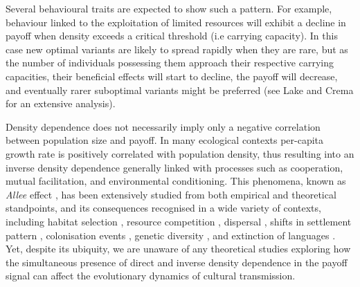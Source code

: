 \documentclass[review,authoryear]{elsarticle}
\begin{document}
Several behavioural traits are expected to show such a pattern. For example, behaviour linked to the exploitation of limited resources will exhibit a decline in payoff when density exceeds a critical threshold (i.e carrying capacity). In this case new optimal variants are likely to spread rapidly when they are rare, but as the number of individuals possessing them approach their respective carrying capacities, their beneficial effects will start to decline, the payoff will decrease, and eventually rarer suboptimal variants might be preferred (see Lake and Crema \citeyear{lake_and_crema_2012} for an extensive analysis). 

Density dependence does not necessarily imply only a negative correlation between population size and payoff. In many ecological contexts per-capita growth rate is positively correlated with population density, thus resulting into an inverse density dependence generally linked with processes such as cooperation, mutual facilitation, and environmental conditioning. This phenomena, known as \emph{Allee} effect \citep{allee1958,courchamp_etal_1999}, has been extensively studied  from both empirical and theoretical standpoints, and its consequences recognised in a wide variety of contexts, including habitat selection \citep{greene_and_stamps_2001}, resource competition \citep{jang2013},  dispersal \citep{steele_2009}, shifts in settlement pattern \citep{crema_2014}, colonisation events  \citep{kennet_etal_2006}, genetic diversity \citep{roques_etal_2012}, and extinction of languages \citep{sutherland_2003}. Yet, despite its ubiquity, we are unaware of any theoretical studies exploring how the simultaneous presence of direct and inverse density dependence in the payoff signal can affect the evolutionary dynamics of cultural transmission.   
\end{document}
